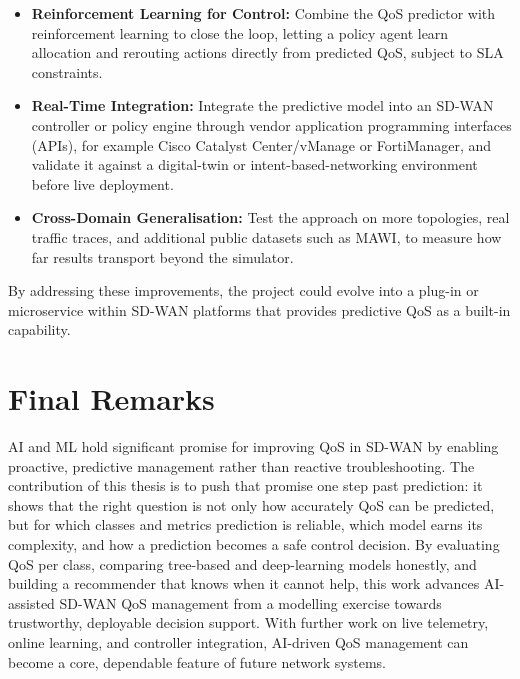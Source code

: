 \documentclass[a4paper,12pt]{Classes/RoboticsLaTeX}
\begin{document}
\begin{itemize}
    \item \textbf{Reinforcement Learning for Control:} Combine the QoS predictor with reinforcement learning to close the loop, letting a policy agent learn allocation and rerouting actions directly from predicted QoS, subject to SLA constraints.
    \item \textbf{Real-Time Integration:} Integrate the predictive model into an SD-WAN controller or policy engine through vendor application programming interfaces (APIs), for example Cisco Catalyst Center/vManage or FortiManager, and validate it against a digital-twin or intent-based-networking environment before live deployment.
    \item \textbf{Cross-Domain Generalisation:} Test the approach on more topologies, real traffic traces, and additional public datasets such as MAWI, to measure how far results transport beyond the simulator.
\end{itemize}

By addressing these improvements, the project could evolve into a plug-in or microservice within SD-WAN platforms that provides predictive QoS as a built-in capability.

\section{Final Remarks}

AI and ML hold significant promise for improving QoS in SD-WAN by enabling proactive, predictive management rather than reactive troubleshooting. The contribution of this thesis is to push that promise one step past prediction: it shows that the right question is not only how accurately QoS can be predicted, but for which classes and metrics prediction is reliable, which model earns its complexity, and how a prediction becomes a safe control decision. By evaluating QoS per class, comparing tree-based and deep-learning models honestly, and building a recommender that knows when it cannot help, this work advances AI-assisted SD-WAN QoS management from a modelling exercise towards trustworthy, deployable decision support. With further work on live telemetry, online learning, and controller integration, AI-driven QoS management can become a core, dependable feature of future network systems.

	
	\renewcommand{\bibname}{References}           %
    
	
\end{document}

